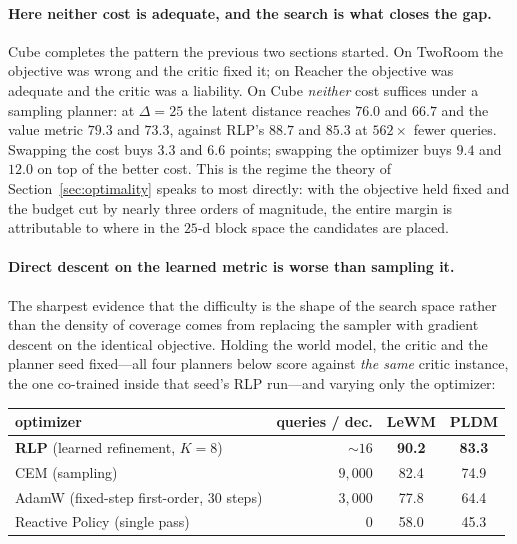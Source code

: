 \paragraph{Here neither cost is adequate, and the search is what closes the gap.}
Cube completes the pattern the previous two sections started. On TwoRoom the
objective was wrong and the critic fixed it; on Reacher the objective was
adequate and the critic was a liability. On Cube \emph{neither} cost suffices
under a sampling planner: at $\Delta = 25$ the latent distance reaches $76.0$
and $66.7$ and the value metric $79.3$ and $73.3$, against RLP's $88.7$ and
$85.3$ at $562\times$ fewer queries. Swapping the cost buys $3.3$ and $6.6$
points; swapping the optimizer buys $9.4$ and $12.0$ on top of the better cost.
This is the regime the theory of Section~\ref{sec:optimality} speaks to most
directly: with the objective held fixed and the budget cut by nearly three
orders of magnitude, the entire margin is attributable to where in the $25$-d
block space the candidates are placed.

\paragraph{Direct descent on the learned metric is worse than sampling it.}
The sharpest evidence that the difficulty is the shape of the search space
rather than the density of coverage comes from replacing the sampler with
gradient descent on the identical objective. Holding the world model, the
critic and the planner seed fixed---all four planners below score against
\emph{the same} critic instance, the one co-trained inside that seed's RLP
run---and varying only the optimizer:

\begin{center}
\begin{tabular}{lrcc}
\toprule
optimizer & queries / dec. & LeWM & PLDM \\
\midrule
\textbf{RLP} (learned refinement, $K{=}8$) & ${\sim}16$ & \textbf{90.2} & \textbf{83.3} \\
CEM (sampling)                             & $9{,}000$  & 82.4 & 74.9 \\
AdamW (fixed-step first-order, $30$ steps) & $3{,}000$  & 77.8 & 64.4 \\
Reactive Policy (single pass)              & $0$        & 58.0 & 45.3 \\
\bottomrule
\end{tabular}
\end{center}

